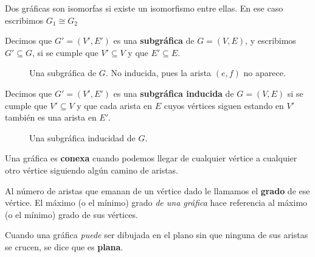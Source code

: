 Dos gr\'aficas son isomorfas si existe un isomorfismo entre ellas. En ese caso escribimos $G_1\cong G_2$

\begin{definition}
Decimos que $G' = (V', E')$ es una \textbf{subgr\'afica} de $G=(V,E)$, y escribimos $G'\subseteq G$, si se cumple que $V'\subseteq V$ y que $E'\subseteq E$.
\end{definition}
\begin{figure}
\centering
  \caption{Una subgr\'afica de $G$. No inducida, pues la arista $(e,f)$ no aparece.}\label{fig:graph}
\end{figure}

\begin{definition}
Decimos que $G' = (V', E')$ es una \textbf{subgr\'afica inducida} de $G=(V,E)$ si se cumple que $V'\subseteq V$ y que cada arista en $E$ cuyos v\'ertices siguen estando en $V'$ tambi\'en es una arista en $E'$.
\end{definition}
\begin{figure}
\centering
  \caption{Una subgr\'afica inducidad de $G$.}\label{fig:graph}
\end{figure}

\begin{definition}
Una gr\'afica es \textbf{conexa} cuando podemos llegar de cualquier v\'ertice a cualquier otro v\'ertice siguiendo alg\'un camino de aristas.
\end{definition}

\begin{definition}
Al n\'umero de aristas que emanan de un v\'ertice dado le llamamos el \textbf{grado} de ese v\'ertice. El m\'aximo (o el m\'inimo) grado \emph{de una gr\'afica} hace referencia al m\'aximo (o el m\'inimo) grado de sus v\'ertices.
\end{definition}

\begin{definition}
Cuando una gr\'afica \textit{puede} ser dibujada en el plano sin que ninguna de sus aristas se crucen, se dice que es \textbf{plana}.
\end{definition}

